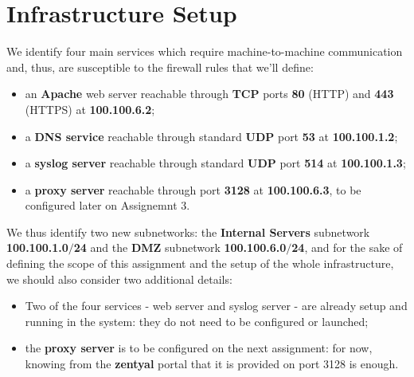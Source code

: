 \section{Infrastructure Setup}
We identify four main services which require machine-to-machine communication and, thus, are susceptible to the firewall rules that we'll define:\\
\begin{itemize}
\item an \textbf{Apache} web server reachable through \textbf{TCP} ports \textbf{80} (HTTP) and \textbf{443} (HTTPS) at \textbf{100.100.6.2};
\item a \textbf{DNS service} reachable through standard \textbf{UDP} port \textbf{53} at \textbf{100.100.1.2};
\item a \textbf{syslog server} reachable through standard \textbf{UDP} port \textbf{514} at \textbf{100.100.1.3};
\item a \textbf{proxy server} reachable through port \textbf{3128} at \textbf{100.100.6.3}, to be configured later on Assignemnt 3.
\end{itemize}

We thus identify two new subnetworks: the \textbf{Internal Servers} subnetwork \textbf{100.100.1.0$/$24} and the \textbf{DMZ} subnetwork \textbf{100.100.6.0$/$24}, and for the sake of defining the scope of this assignment and the setup of the whole infrastructure, we should also consider two additional details:\\
\begin{itemize}
\item Two of the four services - web server and syslog server - are already setup and running in the system: they do not need to be configured or launched;
\item the \textbf{proxy server} is to be configured on the next assignment: for now, knowing from the \textbf{zentyal} portal that it is provided on port 3128 is enough.
\end{itemize}

